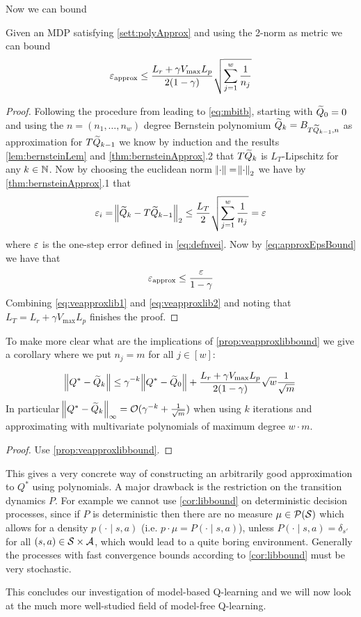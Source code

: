 Now we can bound

\begin{prop}
  Given an MDP satisfying \cref{sett:polyApprox} and using the 2-norm as metric
  we can bound
  \[ \varepsilon_{\mathrm{approx}} \leq \frac{L_r + \gamma V_{\max} L_p}{2(1-\gamma)}
  \sqrt{\sum_{j=1}^w \frac{1}{n_j}} \]
  \label{prop:veapproxlibbound}
\end{prop}
\begin{proof}
  Following the procedure from leading to \cref{eq:mbitb},
  starting with $\widetilde{Q}_0 = 0$
  and using the $n = (n_1, \dots, n_w)$ degree Bernstein polynomium
  $\widetilde{Q}_{k} = B_{T\widetilde{Q}_{k-1}, n}$ as approximation for $T\widetilde{Q}_{k-1}$
  we know by induction and
  the results \cref{lem:bernsteinLem}
  and \cref{thm:bernsteinApprox}.2 that $T\widetilde{Q}_k$ is
  $L_T$-Lipschitz for any $k \in \mathbb{N}$.
  Now by choosing the euclidean norm $\norm{\cdot} = \norm{\cdot}_2$
  we have by \cref{thm:bernsteinApprox}.1 that
  \begin{equation}
    \varepsilon_i = \norm{\widetilde{Q}_k - T\widetilde{Q}_{k-1}}_2
    \leq \frac{L_T}{2} \sqrt{\sum_{j=1}^w \frac{1}{n_j}} = \varepsilon
    \label{eq:veapproxlib1}
  \end{equation}
  where $\varepsilon$ is the one-step error defined in \cref{eq:defnvei}.
  Now by \cref{eq:approxEpsBound}
  we have that
  \begin{equation}
    \varepsilon_{\mathrm{approx}} \leq \frac{\varepsilon}{1-\gamma}
    \label{eq:veapproxlib2}
  \end{equation}
  Combining \cref{eq:veapproxlib1} and \cref{eq:veapproxlib2} and noting
  that $L_T = L_r + \gamma V_{\max} L_p$ finishes the proof.
\end{proof}

To make more clear what are the implications of \cref{prop:veapproxlibbound}
we give a corollary where we put $n_j = m$ for all $j \in [w]$:

\begin{cor}
  \[ \norm{Q^* - \widetilde{Q}_k} \leq \gamma^{-k} \norm{Q^* - \widetilde{Q}_0}
    + \frac{L_r + \gamma V_{\max} L_p}{2(1-\gamma)} \sqrt{w}
  \frac{1}{\sqrt{m}} \]
  In particular $\norm{Q^* - \widetilde{Q}_k}_\infty
  = \mathcal{O}(\gamma^{-k} + \frac{1}{\sqrt{m}})$
  when using $k$ iterations and approximating
  with multivariate polynomials of maximum degree $w \cdot m$.
  \label{cor:libbound}
\end{cor}
\begin{proof}
  Use \cref{prop:veapproxlibbound}.
\end{proof}

This gives a very concrete way of constructing an arbitrarily good
approximation to $Q^*$ using polynomials.
A major drawback is the restriction on the transition dynamics $P$.
For example we cannot use \cref{cor:libbound} on deterministic
decision processes, since if $P$ is deterministic then there
are no measure $\mu \in \mathcal{P}(\mathcal{S})$ which allows for a
density $p(\cdot \mid s, a)$ (i.e. $p \cdot \mu = P(\cdot \mid s, a)$),
unless $P(\cdot \mid s, a) = \delta_{s'}$ for all $(s, a) \in \mathcal{S} \times
\mathcal{A}$, which would lead to a quite boring environment.
Generally the processes with fast convergence bounds 
according to \cref{cor:libbound} must be very stochastic.

This concludes our investigation of model-based Q-learning and we will
now look at the much more well-studied field of model-free Q-learning.

